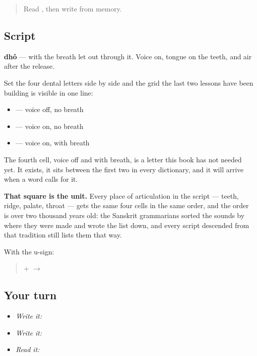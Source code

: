 \begin{quote}
Read \textbf{}, then write \textbf{} from memory.
\end{quote}

\subsection*{Script}
\begin{quote}
\end{quote}

\textbf{dhô} — \textbf{} with the breath let out through it. Voice on, tongue on the teeth, and air after the release.

Set the four dental letters side by side and the grid the last two lessons have been building is visible in one line:

\begin{itemize}
\raggedright
  \item \textbf{} — voice off, no breath
  \item \textbf{} — voice on, no breath
  \item \textbf{} — voice on, with breath
\end{itemize}

The fourth cell, voice off and with breath, is a letter this book has not needed yet. It exists, it sits between the first two in every dictionary, and it will arrive when a word calls for it.

\textbf{That square is the unit.} Every place of articulation in the script — teeth, ridge, palate, throat — gets the same four cells in the same order, and the order is over two thousand years old: the Sanskrit grammarians sorted the sounds by where they were made and wrote the list down, and every script descended from that tradition still lists them that way.

With the u-sign:

\begin{quote}
\textbf{} + \textbf{} $\to$ \textbf{}
\end{quote}

\subsection*{Your turn}
\begin{itemize}
\raggedright
  \item \emph{Write it:} 
  \item \emph{Write it:}   
  \item \emph{Read it:} 
\end{itemize}

